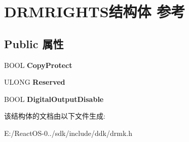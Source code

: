 \hypertarget{struct_d_r_m_r_i_g_h_t_s}{}\section{D\+R\+M\+R\+I\+G\+H\+T\+S结构体 参考}
\label{struct_d_r_m_r_i_g_h_t_s}
\subsection*{Public 属性}
\begin{DoxyCompactItemize}
\item 
\mbox{\label{struct_d_r_m_r_i_g_h_t_s_a73412ea7717592b9eaec044f336a2db5}} 
B\+O\+OL {\bfseries Copy\+Protect}
\item 
\mbox{\label{struct_d_r_m_r_i_g_h_t_s_a8b39551588357d9af63e60fd9bed4bf5}} 
U\+L\+O\+NG {\bfseries Reserved}
\item 
\mbox{\label{struct_d_r_m_r_i_g_h_t_s_ab88ba6885f5e8c5d74d04112da0b0e37}} 
B\+O\+OL {\bfseries Digital\+Output\+Disable}
\end{DoxyCompactItemize}


该结构体的文档由以下文件生成\+:\begin{DoxyCompactItemize}
\item 
E\+:/\+React\+O\+S-\/0../sdk/include/ddk/drmk.\+h\end{DoxyCompactItemize}
